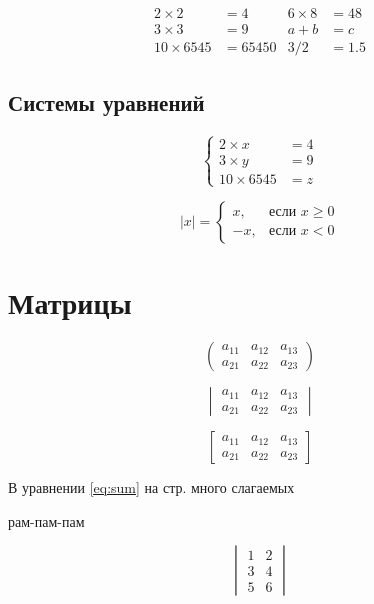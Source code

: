 \documentclass[a4paper,12pt]{article} %
\begin{document}
\begin{equation}
	\begin{aligned}
		2\times 2 &= 4 & 6\times8 &=48\\ 
		3\times 3 &= 9 & a+b &=c\\
		10\times 6545 &=65450 & 3/2 &=1.5
	\end{aligned}
\end{equation}

\subsection{Системы уравнений}

$$\left\{
\begin{aligned}
	2\times x &= 4\\ 
	3\times y &= 9\\
	10\times 6545 &=z
\end{aligned}\right.
$$

$$
|x|=\begin{cases}
	x, &\text{если } x\ge0\\
	-x, &\text{если } x<0
\end{cases}
$$

\section{Матрицы}

$$
\begin{pmatrix}
	a_{11} & a_{12} & a_{13}\\
	a_{21} & a_{22} & a_{23}
\end{pmatrix}
$$

$$
\begin{vmatrix}
	a_{11} & a_{12} & a_{13}\\
	a_{21} & a_{22} & a_{23}
\end{vmatrix}
$$

$$
\begin{bmatrix}
	a_{11} & a_{12} & a_{13}\\
	a_{21} & a_{22} & a_{23}
\end{bmatrix}
$$

В уравнении \eqref{eq:sum} на стр. \pageref{eq:sum} много слагаемых

рам-пам-пам

\[ 
\begin{vmatrix} 
1 & 2\\ 
3 & 4\\ 
5 & 6 
\end{vmatrix} 
\] 
\end{document}
